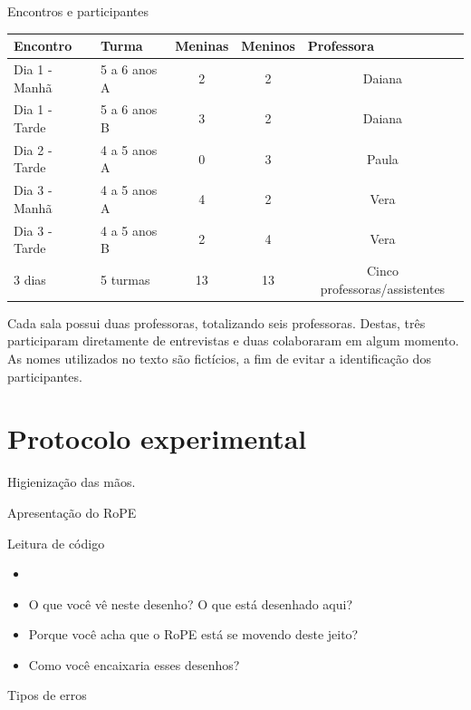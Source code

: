  \begin{quadro}[!htbp]
 		\setlength{\extrarowheight}{5pt}
        \begin{center}
        \caption{Encontros e participantes}
        \label{quadro:participants}
        \begin{tabular}{@{}llccc@{}}
            \toprule
            Encontro & Turma & \multicolumn{1}{l}{Meninas} & \multicolumn{1}{l}{Meninos} & \multicolumn{1}{l}{Professora} \\ \midrule
            Dia 1 - Manhã & 5 a 6 anos A & 2 & 2 & Daiana \\
            Dia 1 - Tarde & 5 a 6 anos B & 3 & 2 & Daiana \\
            Dia 2 - Tarde & 4 a 5 anos A & 0 & 3 & Paula \\
            Dia 3 - Manhã & 4 a 5 anos A & 4 & 2 & Vera \\
            Dia 3 - Tarde & 4 a 5 anos B & 2 & 4 & Vera \\ \midrule
            3 dias        & 5 turmas     & 13 & 13 & Cinco professoras/assistentes \\ \bottomrule 
            \end{tabular}
        \end{center}
        \sourceauthor
    \end{quadro}

Cada sala possui duas professoras, totalizando seis professoras. Destas, três participaram diretamente de entrevistas e duas colaboraram em algum momento. As nomes utilizados no texto são fictícios, a fim de evitar a identificação dos participantes.

\section{Protocolo experimental}
\label{sec:protocolo}
Higienização das mãos.

Apresentação do RoPE

Leitura de código
\begin{itemize}
\item 
\item O que você vê neste desenho? O que está desenhado aqui?
\item Porque você acha que o RoPE está se movendo deste jeito?
\item Como você encaixaria esses desenhos?
\end{itemize}

Tipos de erros



